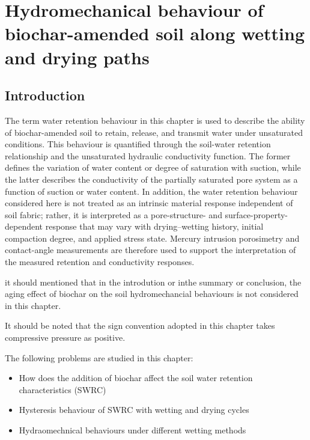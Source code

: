 \chapter{Hydromechanical behaviour of biochar-amended soil along wetting and drying paths}
\section{Introduction}
The term water retention behaviour in this chapter is used to describe the ability of biochar-amended soil to retain, release, and transmit water under unsaturated conditions. This behaviour is quantified through the soil-water retention relationship and the unsaturated hydraulic conductivity function. The former defines the variation of water content or degree of saturation with suction, while the latter describes the conductivity of the partially saturated pore system as a function of suction or water content. In addition, the water retention behaviour considered here is not treated as an intrinsic material response independent of soil fabric; rather, it is interpreted as a pore-structure- and surface-property-dependent response that may vary with drying–wetting history, initial compaction degree, and applied stress state. Mercury intrusion porosimetry and contact-angle measurements are therefore used to support the interpretation of the measured retention and conductivity responses. \par%

it should mentioned that in the introdution or inthe summary or conclusion, the aging effect of biochar on the soil hydromechancial behaviours is not considered in this chapter. \par %

It should be noted that the sign convention adopted in this chapter takes compressive pressure as positive.\par

The following problems are studied in this chapter:
\begin{itemize}
    \item How does the addition of biochar affect the soil water retention characteristics (SWRC)
    \item Hysteresis behaviour of SWRC with wetting and drying cycles
    \item Hydraomechnical behaviours under different wetting methods
\end{itemize} 


